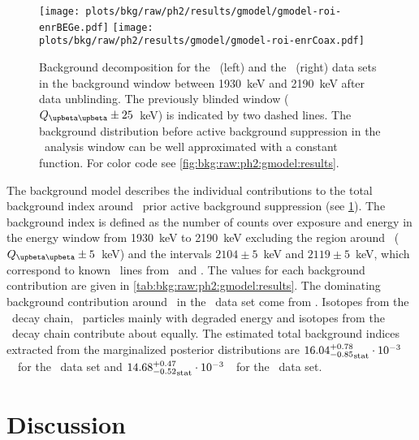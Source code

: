 \begin{figure}
  \centering
  \texttt{[image: plots/bkg/raw/ph2/results/gmodel/gmodel-roi-enrBEGe.pdf]}
  \hspace{12pt}
  \texttt{[image: plots/bkg/raw/ph2/results/gmodel/gmodel-roi-enrCoax.pdf]}
  \caption{%
    Background decomposition for the \enrBEGeII\ (left) and the \enrCoaxII\ (right) data
    sets in the background window between 1930~keV and 2190~keV after data unblinding. The
    previously blinded window ($\qbbM \pm 25$~keV) is indicated by two dashed lines.  The
    background distribution before active background suppression in the \onbb\ analysis
    window can be well approximated with a constant function. For color code see
    \cref{fig:bkg:raw:ph2:gmodel:results}.%
  }\label{fig:bkg:raw:ph2:gmodel:results:roi}
\end{figure}

The background model describes the individual contributions to the total background index
around \qbb\ prior active background suppression (see
\cref{fig:bkg:raw:ph2:gmodel:results:roi}).  The background index is defined as the number
of counts over exposure and energy in the energy window from 1930~keV to 2190~keV
excluding the region around \qbb\ ($\qbbM \pm 5$~keV) and the intervals $2104 \pm 5$~keV
and $2119 \pm 5$~keV, which correspond to known \g\ lines from \Tl\ and \Bih. The values
for each background contribution are given in \cref{tab:bkg:raw:ph2:gmodel:results}. The
dominating background contribution around \qbb\ in the \enrBEGeII\ data set come from
\kvz. Isotopes from the \Thh\ decay chain, \a\ particles mainly with degraded energy and
isotopes from the \Uh\ decay chain contribute about equally. The estimated total
background indices extracted from the marginalized posterior distributions are
${16.04^{+0.78}_{-0.85}}_\text{stat} \cdot 10^{-3}$~\ctsper\ for the \enrBEGeII\ data set and
${14.68^{+0.47}_{-0.52}}_\text{stat} \cdot 10^{-3}$~\ctsper\ for the \enrCoaxII\ data set.

\section{Discussion}%
\label{sec:bkg:raw:ph2:discussion}

